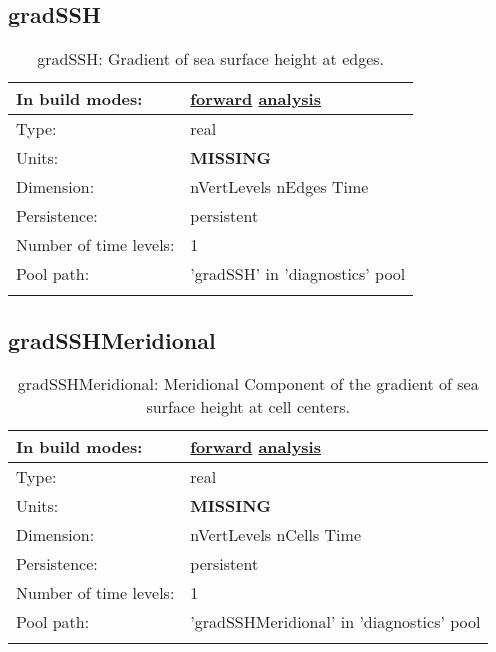 \subsection[gradSSH]{gradSSH}
\label{subsec:var_sec_diagnostics_gradSSH}
\begin{center}
\begin{longtable}{| p{2.0in} | p{4.0in} |}
        \hline 
        In build modes: & \hyperref[subsec:forward_var_tab_diagnostics]{forward} \hyperref[subsec:analysis_var_tab_diagnostics]{analysis} \\
        \hline 
        Type: & real \\
        \hline 
        Units: & {\bf \color{red} MISSING} \\
        \hline 
        Dimension: & nVertLevels nEdges Time \\
        \hline 
        Persistence: & persistent \\
        \hline 
        Number of time levels: & 1 \\
        \hline 
            Pool path: & 'gradSSH' in 'diagnostics' pool
 \\
		 \hline 
    \caption{gradSSH: Gradient of sea surface height at edges.}
\end{longtable}
\end{center}
\subsection[gradSSHMeridional]{gradSSHMeridional}
\label{subsec:var_sec_diagnostics_gradSSHMeridional}
\begin{center}
\begin{longtable}{| p{2.0in} | p{4.0in} |}
        \hline 
        In build modes: & \hyperref[subsec:forward_var_tab_diagnostics]{forward} \hyperref[subsec:analysis_var_tab_diagnostics]{analysis} \\
        \hline 
        Type: & real \\
        \hline 
        Units: & {\bf \color{red} MISSING} \\
        \hline 
        Dimension: & nVertLevels nCells Time \\
        \hline 
        Persistence: & persistent \\
        \hline 
        Number of time levels: & 1 \\
        \hline 
            Pool path: & 'gradSSHMeridional' in 'diagnostics' pool
 \\
		 \hline 
    \caption{gradSSHMeridional: Meridional Component of the gradient of sea surface height at cell centers.}
\end{longtable}
\end{center}
